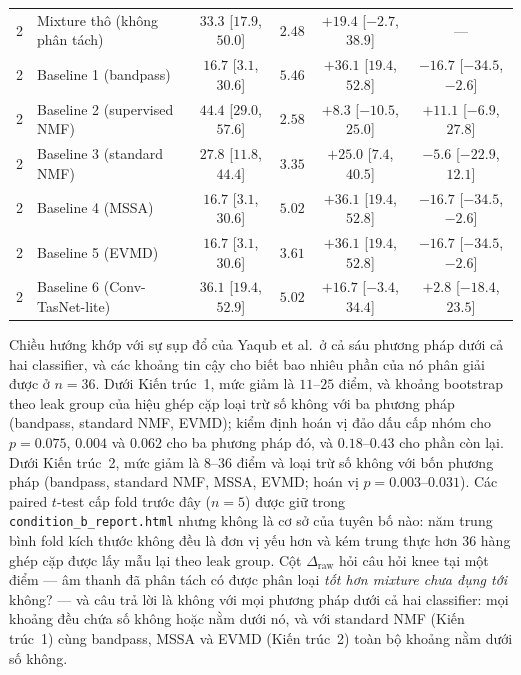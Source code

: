 \documentclass[11pt]{article}
\begin{document}
\begin{table}[H]
\begin{tabular}{@{}llcccc@{}}
2 & Mixture thô (không phân tách) & $33.3$ [$17.9$, $50.0$] & $2.48$ & $+19.4$ [$-2.7$, $38.9$] & --- \\
2 & Baseline 1 (bandpass) & $16.7$ [$3.1$, $30.6$] & $5.46$ & $+36.1$ [$19.4$, $52.8$] & $-16.7$ [$-34.5$, $-2.6$] \\
2 & Baseline 2 (supervised NMF) & $44.4$ [$29.0$, $57.6$] & $2.58$ & $+8.3$ [$-10.5$, $25.0$] & $+11.1$ [$-6.9$, $27.8$] \\
2 & Baseline 3 (standard NMF) & $27.8$ [$11.8$, $44.4$] & $3.35$ & $+25.0$ [$7.4$, $40.5$] & $-5.6$ [$-22.9$, $12.1$] \\
2 & Baseline 4 (MSSA) & $16.7$ [$3.1$, $30.6$] & $5.02$ & $+36.1$ [$19.4$, $52.8$] & $-16.7$ [$-34.5$, $-2.6$] \\
2 & Baseline 5 (EVMD) & $16.7$ [$3.1$, $30.6$] & $3.61$ & $+36.1$ [$19.4$, $52.8$] & $-16.7$ [$-34.5$, $-2.6$] \\
2 & Baseline 6 (Conv-TasNet-lite) & $36.1$ [$19.4$, $52.9$] & $5.02$ & $+16.7$ [$-3.4$, $34.4$] & $+2.8$ [$-18.4$, $23.5$] \\
\bottomrule
\end{tabular}
\end{table}

Chiều hướng khớp với sự sụp đổ của Yaqub et al.\ ở cả sáu phương pháp
dưới cả hai classifier, và các khoảng tin cậy cho biết bao nhiêu phần
của nó phân giải được ở $n{=}36$. Dưới Kiến trúc~1, mức giảm là $11$--$25$
điểm, và khoảng bootstrap theo leak group của hiệu ghép cặp loại trừ số
không với ba phương pháp (bandpass, standard NMF, EVMD); kiểm định hoán vị
đảo dấu cấp nhóm cho $p = 0.075$, $0.004$ và $0.062$ cho ba phương pháp
đó, và $0.18$--$0.43$ cho phần còn lại. Dưới Kiến trúc~2, mức giảm là
$8$--$36$ điểm và loại trừ số không với bốn phương pháp (bandpass, standard
NMF, MSSA, EVMD; hoán vị $p = 0.003$--$0.031$). Các paired $t$-test cấp
fold trước đây ($n{=}5$) được giữ trong \texttt{condition\_b\_report.html}
nhưng không là cơ sở của tuyên bố nào: năm trung bình fold kích thước
không đều là đơn vị yếu hơn và kém trung thực hơn 36 hàng ghép cặp được
lấy mẫu lại theo leak group. Cột $\Delta_{\text{raw}}$ hỏi câu hỏi knee
tại một điểm --- âm thanh đã phân tách có được phân loại \emph{tốt hơn
mixture chưa đụng tới} không? --- và câu trả lời là không với mọi phương
pháp dưới cả hai classifier: mọi khoảng đều chứa số không hoặc nằm dưới
nó, và với standard NMF (Kiến trúc~1) cùng bandpass, MSSA và EVMD (Kiến
trúc~2) toàn bộ khoảng nằm dưới số không.
\end{document}
